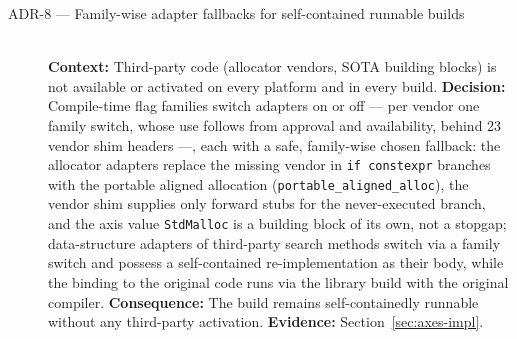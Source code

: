 \begin{description}
  \item[ADR-8 --- Family-wise adapter fallbacks for self-contained runnable builds]\hfill\\
  \textbf{Context:} Third-party code (allocator vendors, SOTA building blocks) is not available
  or activated on every platform and in every build.
  \textbf{Decision:} Compile-time flag families switch adapters on or off --- per vendor one
  family switch, whose use follows from approval and availability, behind 23 vendor shim headers
  ---, each with a safe, family-wise chosen fallback: the allocator adapters replace the missing
  vendor in \texttt{if constexpr} branches with the portable aligned allocation
  (\texttt{portable\_aligned\_alloc}), the vendor shim supplies only forward stubs for the
  never-executed branch, and the axis value \texttt{StdMalloc} is a building block of its own, not
  a stopgap; data-structure adapters of third-party search methods switch via a family switch and
  possess a self-contained re-implementation as their body, while the binding to the original code
  runs via the library build with the original compiler.
  \textbf{Consequence:} The build remains self-containedly runnable without any third-party
  activation.
  \textbf{Evidence:} Section~\ref{sec:axes-impl}.


\end{description}
